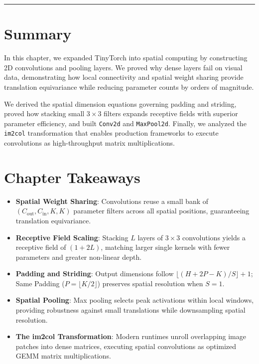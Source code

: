 \documentclass[
  letterpaper,
]{scrbook}
\providecommand{\tightlist}{%
  \setlength{\itemsep}{0pt}\setlength{\parskip}{0pt}}
\begin{document}
\begin{center}\rule{0.5\linewidth}{0.5pt}\end{center}

\section{Summary}\label{summary-9}

In this chapter, we expanded TinyTorch into spatial computing by
constructing 2D convolutions and pooling layers. We proved why dense
layers fail on visual data, demonstrating how local connectivity and
spatial weight sharing provide translation equivariance while reducing
parameter counts by orders of magnitude.

We derived the spatial dimension equations governing padding and
striding, proved how stacking small \(3 \times 3\) filters expands
receptive fields with superior parameter efficiency, and built
\texttt{Conv2d} and \texttt{MaxPool2d}. Finally, we analyzed the
\texttt{im2col} transformation that enables production frameworks to
execute convolutions as high-throughput matrix multiplications.

\section{Chapter Takeaways}\label{chapter-takeaways-9}

\begin{itemize}
\tightlist
\item
  \textbf{Spatial Weight Sharing}: Convolutions reuse a small bank of
  \((C_{\text{out}}, C_{\text{in}}, K, K)\) parameter filters across all
  spatial positions, guaranteeing translation equivariance.
\item
  \textbf{Receptive Field Scaling}: Stacking \(L\) layers of
  \(3 \times 3\) convolutions yields a receptive field of \((1 + 2L)\),
  matching larger single kernels with fewer parameters and greater
  non-linear depth.
\item
  \textbf{Padding and Striding}: Output dimensions follow
  \(\lfloor (H + 2P - K)/S \rfloor + 1\); Same Padding
  (\(P = \lfloor K/2 \rfloor\)) preserves spatial resolution when
  \(S = 1\).
\item
  \textbf{Spatial Pooling}: Max pooling selects peak activations within
  local windows, providing robustness against small translations while
  downsampling spatial resolution.
\item
  \textbf{The im2col Transformation}: Modern runtimes unroll overlapping
  image patches into dense matrices, executing spatial convolutions as
  optimized GEMM matrix multiplications.
\end{itemize}
\end{document}
